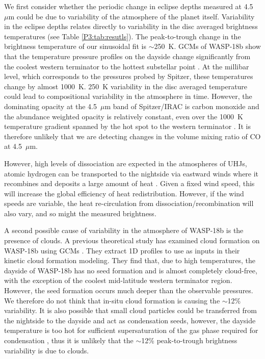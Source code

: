 We first consider whether the periodic change in eclipse depths measured at 4.5~$\mu$m could be due to variability of the atmosphere of the planet itself. Variability in the eclipse depths relates directly to variability in the disc averaged brightness temperatures (see Table \ref{P3:tab:resutls}). The peak-to-trough change in the brightness temperature of our sinusoidal fit is $\sim$250~K. GCMs of WASP-18b show that the temperature pressure profiles on the dayside change significantly from the coolest western terminator to the hottest substellar point \citet{Helling2019b}. At the millibar level, which corresponds to the pressures probed by Spitzer, these temperatures change by almost 1000~K. 250~K variability in the disc averaged temperature could lead to compositional variability in the atmosphere in time. However, the dominating opacity at the 4.5~$\mu$m band of Spitzer/IRAC is carbon monoxide and the abundance weighted opacity is relatively constant, even over the 1000~K temperature gradient spanned by the hot spot to the western terminator \citep[e.g.,][]{Moses2013}. It is therefore unlikely that we are detecting changes in the volume mixing ratio of CO at 4.5~$\mu$m.

However, high levels of  dissociation are expected in the atmospheres of UHJs, atomic hydrogen can be transported to the nightside via eastward winds where it recombines and deposits a large amount of heat \citep{Komacek2018, Bell2018}. Given a fixed wind speed, this will increase the global efficiency of heat redistribution. However, if the wind speeds are variable, the heat re-circulation from  dissociation/recombination will also vary, and so might the measured brightness.

A second possible cause of variability in the atmosphere of WASP-18b is the presence of clouds. A previous theoretical study has examined cloud formation on WASP-18b using GCMs \citep{Helling2019b}. They extract 1D profiles to use as inputs in their kinetic cloud formation modeling. They find that, due to high temperatures, the dayside of WASP-18b has no seed formation and is almost completely cloud-free, with the exception of the coolest mid-latitude western terminator region. However, the seed formation occurs much deeper than the observable pressures. We therefore do not think that in-situ cloud formation is causing the $\sim$12\% variability. It is also possible that small cloud particles could be transferred from the nightside to the dayside and act as condensation seeds, however, the dayside temperature is too hot for sufficient supersaturation of the gas phase required for condensation \citep{Helling2019b}, thus it is unlikely that the $\sim$12\% peak-to-trough brightness variability is due to clouds.

